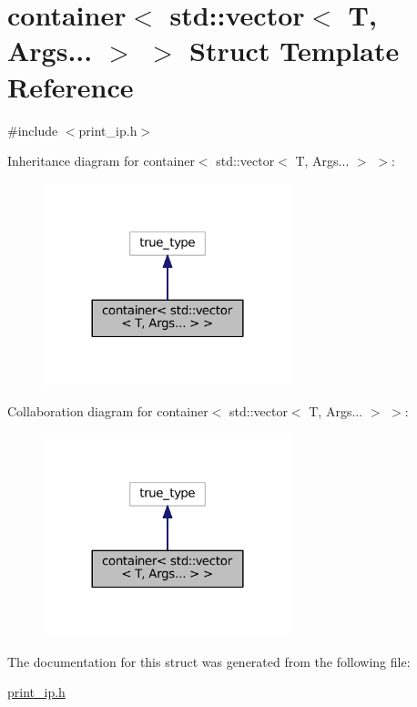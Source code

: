 \hypertarget{structcontainer_3_01std_1_1vector_3_01T_00_01Args_8_8_8_01_4_01_4}{}\section{container$<$ std\+:\+:vector$<$ T, Args... $>$ $>$ Struct Template Reference}
\label{structcontainer_3_01std_1_1vector_3_01T_00_01Args_8_8_8_01_4_01_4}


{\ttfamily \#include $<$print\+\_\+ip.\+h$>$}



Inheritance diagram for container$<$ std\+:\+:vector$<$ T, Args... $>$ $>$\+:
\nopagebreak
\begin{figure}[H]
\begin{center}
\leavevmode
\includegraphics[width=204pt]{structcontainer_3_01std_1_1vector_3_01T_00_01Args_8_8_8_01_4_01_4__inherit__graph}
\end{center}
\end{figure}


Collaboration diagram for container$<$ std\+:\+:vector$<$ T, Args... $>$ $>$\+:
\nopagebreak
\begin{figure}[H]
\begin{center}
\leavevmode
\includegraphics[width=204pt]{structcontainer_3_01std_1_1vector_3_01T_00_01Args_8_8_8_01_4_01_4__coll__graph}
\end{center}
\end{figure}


The documentation for this struct was generated from the following file\+:\begin{DoxyCompactItemize}
\item 
\hyperlink{print__ip_8h}{print\+\_\+ip.\+h}\end{DoxyCompactItemize}
